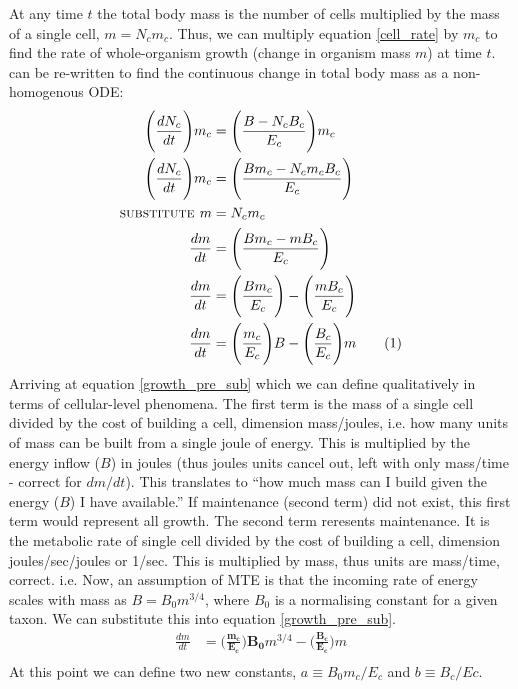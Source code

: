 \documentclass[a4paper]{article} %
\newcommand\numberthis{\addtocounter{equation}{1}\tag{\theequation}}
\begin{document}
At any time $t$ the total body mass is the number of cells multiplied by the mass of a single cell, $m = N_{c}m_{c}$. Thus, we can multiply equation \eqref{cell_rate} by $m_{c}$ to find the rate of whole-organism growth (change in organism mass $m$) at time $t$. can be re-written to find the continuous change in total body mass as a non-homogenous ODE:
\begin{align*}
    \Bigg(\frac{dN_{c}}{dt}\Bigg)m_c &= \Bigg(\frac{B - N_{c}B_{c}}{E_{c}}\Bigg)m_c \\
    \Bigg(\frac{dN_{c}}{dt}\Bigg)m_c &= \Bigg(\frac{Bm_c - N_{c}m_{c}B_{c}}{E_c}\Bigg) \\
    \textsc{substitute } m &= N_{c}m_{c} \\
    \frac{dm}{dt} &= \Bigg(\frac{Bm_c - mB_{c}}{E_c}\Bigg) \\
    \frac{dm}{dt} &= \Bigg(\frac{Bm_c}{E_c}\Bigg) - \Bigg(\frac{mB_{c}}{E_c}\Bigg) \\
    \frac{dm}{dt} &= \Bigg(\frac{m_c}{E_c}\Bigg)B - \Bigg(\frac{B_{c}}{E_c}\Bigg)m \numberthis \label{growth_pre_sub}
\end{align*}
Arriving at equation \eqref{growth_pre_sub} which we can define qualitatively in terms of cellular-level phenomena. The first term is the mass of a single cell divided by the cost of building a cell, dimension mass/joules, i.e. how many units of mass can be built from a single joule of energy. This is multiplied by the energy inflow ($B$) in joules (thus joules units cancel out, left with only mass/time - correct for $dm/dt$). This translates to ``how much mass can I build given the energy ($B$) I have available.'' If maintenance (second term) did not exist, this first term would represent all growth. The second term reresents maintenance. It is the metabolic rate of single cell divided by the cost of building a cell, dimension joules/sec/joules or 1/sec. This is multiplied by mass, thus units are mass/time, correct. i.e. 
Now, an assumption of MTE is that the incoming rate of energy scales with mass as $B = B_{0}m^{3/4}$, where $B_0$ is a normalising constant for a given taxon. We can substitute this into equation \ref{growth_pre_sub}.
\begin{align*}
    \frac{dm}{dt} &= \bm{\Bigg(\frac{m_c}{E_c}\Bigg)B_{0}}m^{3/4} - \bm{\Bigg(\frac{B_{c}}{E_c}\Bigg)}m \\
\end{align*}
At this point we can define two new constants, $a \equiv B_{0}m_{c}/E_{c}$ and $b \equiv B_{c}/E{c}$.
\end{document}
